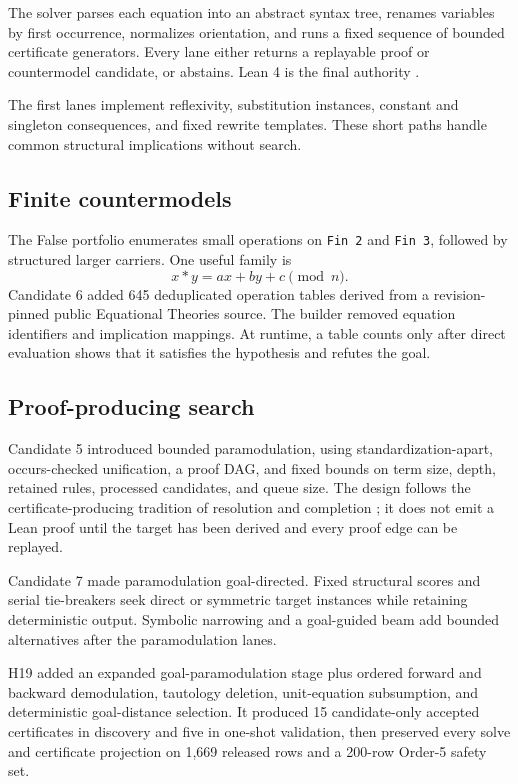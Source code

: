 \documentclass[10pt]{article}
\newcommand{\code}[1]{\texttt{#1}}
\begin{document}
The solver parses each equation into an abstract syntax tree, renames variables by first occurrence, normalizes orientation, and runs a fixed sequence of bounded certificate generators. Every lane either returns a replayable proof or countermodel candidate, or abstains. Lean 4 is the final authority \cite{demoura2021lean4}.

The first lanes implement reflexivity, substitution instances, constant and singleton consequences, and fixed rewrite templates. These short paths handle common structural implications without search.

\subsection{Finite countermodels}

The False portfolio enumerates small operations on \code{Fin 2} and \code{Fin 3}, followed by structured larger carriers. One useful family is
\[
  x*y = ax + by + c \pmod n.
\]
Candidate 6 added 645 deduplicated operation tables derived from a revision-pinned public Equational Theories source. The builder removed equation identifiers and implication mappings. At runtime, a table counts only after direct evaluation shows that it satisfies the hypothesis and refutes the goal.

\subsection{Proof-producing search}

Candidate 5 introduced bounded paramodulation, using standardization-apart, occurs-checked unification, a proof DAG, and fixed bounds on term size, depth, retained rules, processed candidates, and queue size. The design follows the certificate-producing tradition of resolution and completion \cite{robinson1965machine,knuth1970simple}; it does not emit a Lean proof until the target has been derived and every proof edge can be replayed.

Candidate 7 made paramodulation goal-directed. Fixed structural scores and serial tie-breakers seek direct or symmetric target instances while retaining deterministic output. Symbolic narrowing and a goal-guided beam add bounded alternatives after the paramodulation lanes.

H19 added an expanded goal-paramodulation stage plus ordered forward and backward demodulation, tautology deletion, unit-equation subsumption, and deterministic goal-distance selection. It produced 15 candidate-only accepted certificates in discovery and five in one-shot validation, then preserved every solve and certificate projection on 1,669 released rows and a 200-row Order-5 safety set.
\end{document}
